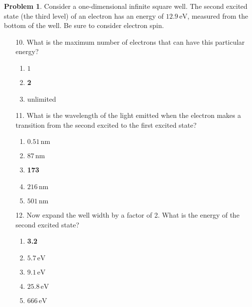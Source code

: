 \documentclass[12pt]{article}
\theoremstyle{definition} %
\newtheorem{problem}{Problem}
\theoremstyle{plain} %
\begin{document}
\begin{problem}
    Consider a one-dimensional infinite square well. The second excited state (the third level) of an electron has an energy of \(12.9 \, \text{eV}\), measured from the bottom of the well. Be sure to consider electron spin.

\begin{enumerate}
    \item[10.] What is the maximum number of electrons that can have this particular energy?
    \begin{enumerate}
        \item \(1\)
        \item \textbf{2}
        \item unlimited
    \end{enumerate}

    \item[11.] What is the wavelength of the light emitted when the electron makes a transition from the second excited to the first excited state?
    \begin{enumerate}
        \item \(0.51 \, \text{nm}\)
        \item \(87 \, \text{nm}\)
        \item \textbf{173 \, }
        \item \(216 \, \text{nm}\)
        \item \(501 \, \text{nm}\)
    \end{enumerate}

    \item[12.] Now expand the well width by a factor of 2. What is the energy of the second excited state?
    \begin{enumerate}
        \item \textbf{3.2 \, }
        \item \(5.7 \, \text{eV}\)
        \item \(9.1 \, \text{eV}\)
        \item \(25.8 \, \text{eV}\)
        \item \(666 \, \text{eV}\)
    \end{enumerate}
\end{enumerate}


\end{problem}
\end{document}
